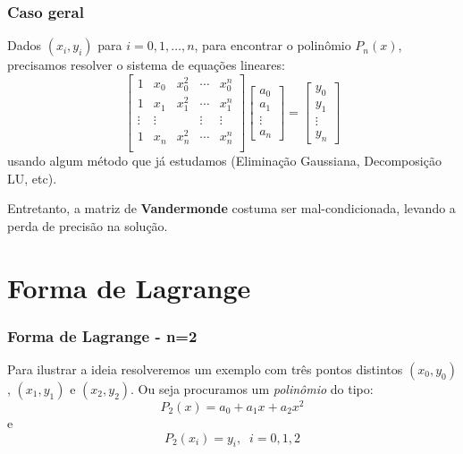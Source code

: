 \documentclass{beamer}
\theoremstyle{mystyle}
\begin{document}
\begin{frame}
	\frametitle{Caso geral}
	Dados $ (x_{i} , y_{i} ) $ para $ i = 0, 1,\ldots, n$, para encontrar o	polinômio $ P_{n} (x) $, precisamos resolver o sistema de equações lineares:
	\begin{equation*}
		\left[
		\begin{array}{ccccc}
			1 & x_{0} & x_{0}^{2} & \cdots & x_{0}^{n} \\
			1 & x_{1} & x_{1}^{2} & \cdots & x_{1}^{n} \\
			\vdots & \vdots & & \vdots & \vdots \\
			1 & x_{n} & x_{n}^{2} & \cdots & x_{n}^{n} \\
		\end{array}
		\right] 
		\begin{bmatrix} a_{0} \\ a_{1} \\ \vdots \\ a_{n} \end{bmatrix}
		=
		\begin{bmatrix} y_{0} \\ y_{1} \\ \vdots \\ y_{n} \end{bmatrix}
	\end{equation*}
	usando algum método que já estudamos (Eliminação Gaussiana,	Decomposição LU, etc).
	
	Entretanto, a matriz de \textbf{Vandermonde} costuma ser \alert{mal-condicionada}, levando a perda de precisão na solução.		
\end{frame}

\section{Forma de Lagrange}

\begin{frame}
	\frametitle{Forma de Lagrange - n=2 }
	Para ilustrar a ideia resolveremos um exemplo com três pontos distintos $ (x_{0}, y_{0})$, $ (x_{1}, y_{1}) $ e $ (x_{2}, y_{2}) $.
	Ou seja procuramos um \textit{polinômio} do tipo:
	\begin{equation*}
		P_{2}(x) = a_{0} + a_{1}x + a_{2}x^{2}
	\end{equation*}
	e
	\begin{equation*}
		P_{2}(x_{i}) = y_{i}, \;\; i=0,1,2
	\end{equation*}
\end{frame}
\end{document}
